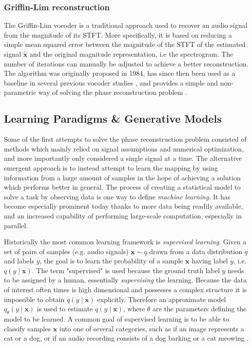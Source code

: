 \documentclass{article}
\begin{document}
\subsubsection{Griffin-Lim reconstruction}

The Griffin-Lim vocoder is a traditional approach used to recover an audio signal from the magnitude of its STFT. More specifically, it is based on reducing a simple mean squared error between the magnitude of the STFT of the estimated signal $\tilde{\bm{x}}$ and the original magnitude representation, i.e the spectrogram. The number of iterations can manually be adjusted to achieve a better reconstruction. The algorithm was originally proposed in 1984, has since then been used as a baseline in several previous vocoder studies \cite{wang2017tacotron, prenger2019waveglow}, and provides a simple and non-parametric way of solving the phase reconstruction problem \cite{griffin1984signal, albadawy2022vocbench}.

\subsection{Learning Paradigms \& Generative Models}

Some of the first attempts to solve the phase reconstruction problem consisted of methods which mainly relied on signal assumptions and numerical optimization, and more importantly only considered a single signal at a time. The alternative emergent approach is to instead attempt to learn the mapping by using information from a large amount of samples in the hope of achieving a solution which performs better in general. The process of creating a statistical model to solve a task by observing data is one way to define \textit{machine learning}. It has become especially prominent today thanks to more data being readily available, and an increased capability of performing large-scale computation, especially in parallel.

Historically the most common learning framework is \textit{supervised learning}. Given a set of pairs of samples (e.g. audio signals) $\bm{x} \sim q$ drawn from a data distribution $q$ and labels $y$, the goal is to learn the probability of a sample $\bm{x}$ having label $y$, i.e. $q(y\mid \bm{x})$. The term "supervised" is used because the ground truth label $y$ needs to be assigned by a human, essentially \textit{supervising} the learning. Because the data of interest often times is high dimensional and possesses a complex structure it is impossible to obtain $q(y \mid \bm{x})$ explicitly. Therefore an approximate model $q_{\theta}(y \mid \bm{x})$ is used to estimate $q(y \mid \bm{x})$, where $\theta$ are the parameters defining the model to be learned. A common goal of supervised learning is to be able to classify samples $\bm{x}$ into one of several categories, such as if an image represents a cat or a dog, or if an audio recording consists of a dog barking or a cat meowing \cite{goodfellow2016deep}. 
\end{document}
